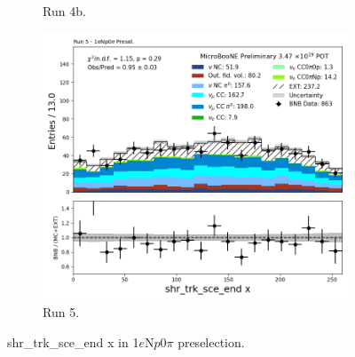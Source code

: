 \begin{figure}[H]
\begin{subfigure}[t]{0.32\linewidth}
        \caption{Run 4b.}
    \end{subfigure}%
    \hspace{0.2cm}%
    \begin{subfigure}[t]{0.32\linewidth}
        \includegraphics[width=\linewidth]{technote/Appendix_Preselection/Figures/1eNp0pi/Run5/shr_trk_sce_end_x_Run5_1eNp0pi_Presel.png}
        \caption{Run 5.}
    \end{subfigure}
    \caption{shr\_trk\_sce\_end x in 1$e$N$p$0$\pi$ preselection.}
\end{figure}


